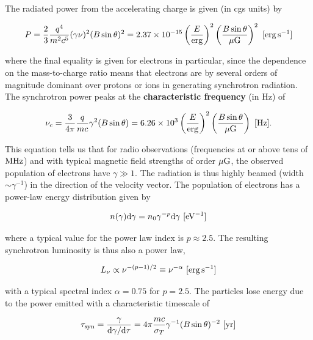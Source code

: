 \documentclass[a4paper,10pt]{article}
\begin{document}
{\noindent}The radiated power from the accelerating charge is given (in cgs units) by

\begin{align*}
    P = \frac{2}{3}\frac{q^4}{m^2c^5} (\gamma\nu)^2 (B\sin\theta)^2 = 2.37\times10^{-15} \left(\frac{E}{{\rm erg}}\right)^2 \left(\frac{B\sin\theta}{\mu{\rm G}}\right)^2 ~ [{\rm erg\,s^{-1}}]
\end{align*}

{\noindent}where the final equality is given for electrons in particular, since the dependence on the mass-to-charge ratio means that electrons are by several orders of magnitude dominant over protons or ions in generating synchrotron radiation. The synchrotron power peaks at the \textbf{characteristic frequency} (in Hz) of

\begin{align*}
    \nu_c = \frac{3}{4\pi}\frac{q}{mc}\gamma^2(B\sin\theta) = 6.26\times10^3 \left(\frac{E}{{\rm erg}}\right)^2 \left(\frac{B\sin\theta}{\mu{\rm G}}\right) ~ [{\rm Hz}].
\end{align*}

{\noindent}This equation tells us that for radio observations (frequencies at or above tens of ${\rm MHz}$) and with typical magnetic field strengths of order $\mu{\rm G}$, the observed population of electrons have $\gamma\gg1$. The radiation is thus highly beamed (width $\sim\gamma^{-1}$) in the direction of the velocity vector. The population of electrons has a power-law energy distribution given by

\begin{align*}
    n(\gamma){\rm d}\gamma = n_0\gamma^{-p}{\rm d}\gamma ~ [{\rm eV^{-1}}]
\end{align*}

{\noindent}where a typical value for the power law index is $p\approx2.5$. The resulting synchrotron luminosity is thus also a power law,

\begin{align*}
    L_\nu \propto \nu^{-(p-1)/2}\equiv \nu^{-\alpha} ~ [{\rm erg\,s^{-1}}]
\end{align*}

{\noindent}with a typical spectral index $\alpha=0.75$ for $p=2.5$. The particles lose energy due to the power emitted with a characteristic timescale of

\begin{align*}
    \tau_{\rm syn} = \frac{\gamma}{{\rm d}\gamma/{\rm d}\tau} = 4\pi\frac{mc}{\sigma_T}\gamma^{-1}(B\sin\theta)^{-2} ~ [{\rm yr}]
\end{align*}
\end{document}
